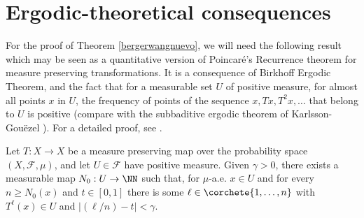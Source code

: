 \section{Ergodic-theoretical consequences}\label{seccioncinco}
For the proof of Theorem \ref{bergerwangnuevo}, we will need the following result which may be seen as a quantitative version of Poincaré's Recurrence theorem for measure preserving transformations. It is a consequence of Birkhoff Ergodic Theorem, and the fact that for a measurable set $U$ of positive measure, for almost all points $x$ in $U$, the frequency of points of the sequence $x,Tx,T^{2}x,\dots$ that belong to $U$ is positive (compare with the subbaditive ergodic theorem of Karlsson-Gouëzel \cite[Th.\,1.1]{goukar}). For a detailed proof, see \cite[Lem.\,3.12]{bochilya}.
\begin{lema}\label{superpoincare}
Let $T:X\rightarrow X$ be a measure preserving map over the probability space $(X,\mathcal{F},\mu)$, and let $U\in \mathcal{F}$ have positive measure. Given $\gamma>0$, there exists a measurable map $N_0:U\rightarrow \NN$ such that, for $\mu$-a.e. $x\in U$ and for every $n\geq N_{0}(x)$ and $t\in [0,1]$ there is some $\ell \in \corchete{1,\dots,n}$ with $T^{\ell}(x)\in U$ and $|(\ell/n)-t|<\gamma$.
\end{lema}
